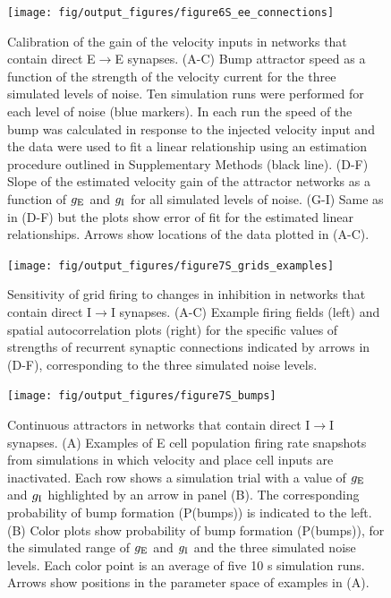 \documentclass[a4paper,12pt]{article}
\newcommand{\ssc}[3]{\ensuremath{#1_{\text{#2}_{\text{#3}}}}}
\newcommand{\gE      }{\ssc{g}      {\scriptsize{E}}{}}
\newcommand{\gI      }{\ssc{g}      {\scriptsize{I}}{}}
\begin{document}
\begin{figure}[ht!]
    \internallinenumbers
    \centering
        \texttt{[image: fig/output\_figures/figure6S\_ee\_connections]}
    \caption{Calibration of the gain of the velocity inputs in networks that
    contain direct E$\rightarrow$E synapses. (A-C) Bump attractor speed as a
    function of the strength of the velocity current for the three simulated
    levels of noise. Ten simulation runs were performed for each level of noise
    (blue markers). In each run the speed of the bump was calculated in
    response to the injected velocity input and the data were used to fit a
    linear relationship using an estimation procedure outlined in Supplementary
    Methods (black line). (D-F) Slope of the estimated velocity gain of the
    attractor networks as a function of $\gE$ and $\gI$ for all simulated
    levels of noise. (G-I) Same as in (D-F) but the plots show error of fit for
    the estimated linear relationships. Arrows show locations of the data
    plotted in (A-C).}
\end{figure}

\clearpage

\setcounter{figure}{0}
\renewcommand{\figurename}{Figure 7 - figure supplement}


\begin{figure}[p]
    \internallinenumbers
    \centering
        \texttt{[image: fig/output\_figures/figure7S\_grids\_examples]}
    \caption{Sensitivity of grid firing to changes in inhibition in networks
    that contain direct I$\rightarrow$I synapses. (A-C) Example
    firing fields (left) and spatial autocorrelation plots (right) for the
    specific values of strengths of recurrent synaptic connections indicated by
    arrows in (D-F), corresponding to the three simulated noise levels.
    }
\end{figure}

\clearpage

\begin{figure}[p]
    \internallinenumbers
    \centering
        \texttt{[image: fig/output\_figures/figure7S\_bumps]}
    \caption{Continuous attractors in networks that contain direct
    I$\rightarrow$I synapses. (A) Examples of E cell population firing rate
    snapshots from simulations in which velocity and place cell inputs are
    inactivated. Each row shows a simulation trial with a value of $\gE$ and
    $\gI$
    highlighted by an arrow in panel (B). The corresponding probability of bump
    formation (P(bumps)) is indicated to the left.  (B) Color plots show
    probability of bump formation (P(bumps)), for the simulated range of $\gE$ and
    $\gI$ and the three simulated noise levels. Each color point is an average of
    five 10 s simulation runs. Arrows show positions in the parameter space of
    examples in (A).}
\end{figure}
\end{document}
